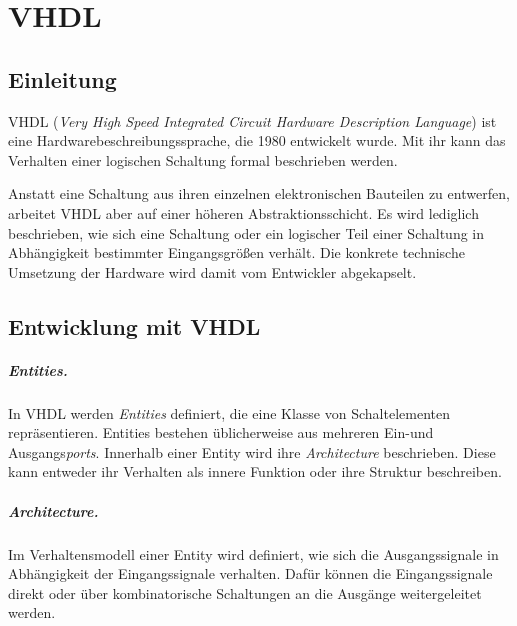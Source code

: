 \chapter{VHDL} %
\label{VHDL} %

\section{Einleitung}
VHDL (\textit{Very High Speed Integrated Circuit Hardware Description Language}) ist eine Hardwarebeschreibungssprache, die 1980 entwickelt wurde. Mit ihr kann das Verhalten einer logischen Schaltung formal beschrieben werden. \cite[S. 22f.]{kesel2013entwurf}

Anstatt eine Schaltung aus ihren einzelnen elektronischen Bauteilen zu entwerfen, arbeitet VHDL aber auf einer höheren Abstraktionsschicht. Es wird lediglich beschrieben, wie sich eine Schaltung oder ein logischer Teil einer Schaltung in Abhängigkeit bestimmter Eingangsgrößen verhält. Die konkrete technische Umsetzung der Hardware wird damit vom Entwickler abgekapselt.

\section{Entwicklung mit VHDL}
\paragraph{Entities.} In VHDL werden \textit{Entities} definiert, die eine Klasse von Schaltelementen repräsentieren. Entities bestehen üblicherweise aus mehreren Ein-und Ausgangs\textit{ports}. Innerhalb einer Entity wird ihre \emph{Architecture} beschrieben. Diese kann entweder ihr Verhalten als innere Funktion oder ihre Struktur beschreiben.

\paragraph{Architecture.} Im Verhaltensmodell einer Entity wird definiert, wie sich die Ausgangssignale in Abhängigkeit der Eingangssignale verhalten. Dafür können die Eingangssignale direkt oder über kombinatorische Schaltungen an die Ausgänge weitergeleitet werden. 


